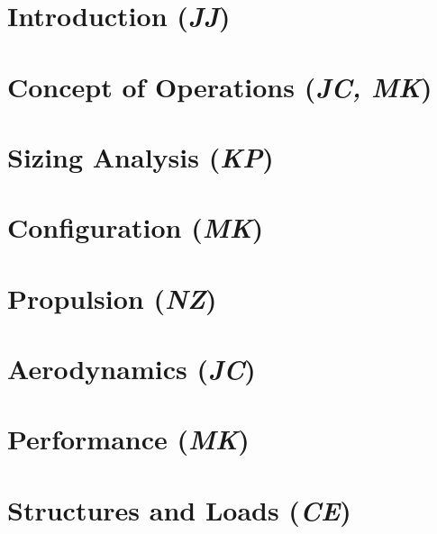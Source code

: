 \documentclass[conf]{new-aiaa}
\begin{document}

\section{Introduction (\textit{JJ})}
\label{section: Intro}


\section{Concept of Operations (\textit{JC, MK})}
\label{section: Conops}


\section{Sizing Analysis (\textit{KP})}
\label{section: Sizing Analysis}


\section{Configuration (\textit{MK})}
\label{section: Configuration}


\section{Propulsion (\textit{NZ})}
\label{section: Propulsion}


\clearpage
\section{Aerodynamics (\textit{JC})}
\label{section: Aerodynamics}


\section{Performance (\textit{MK})}
\label{section: Performance}


% 

\section{Structures and Loads (\textit{CE})}
\label{section: Structures and Loads}

\end{document}
